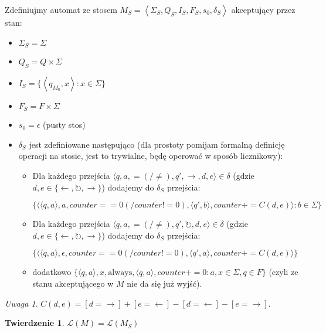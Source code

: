 \documentclass{article}
\newtheorem{theorem}{Twierdzenie}[section]
\theoremstyle{definition}
\theoremstyle{remark}
\newtheorem{remark}{Uwaga}[section]
\begin{document}
Zdefiniujmy automat ze stosem \(M_S = \left<\Sigma_S, Q_S, I_{S}, F_S, s_0, \delta_S \right>\) akceptujący przez stan:
\begin{itemize}
\item \(\Sigma_S = \Sigma\)
\item \(Q_S = Q \times \Sigma\)
\item \(I_S = \{ \left< q_{M_0}, x\right>: x \in \Sigma \}\)
\item \(F_S = F \times \Sigma\)
\item \(s_0 = \epsilon\) (pusty stos)
\item \(\delta_S\) jest zdefiniowane następująco (dla prostoty pomijam formalną definicję operacji na stosie, jest to trywialne,
będę operować w sposób licznikowy):
\begin{itemize}
    \item Dla każdego przejścia $\langle q, a, = (/ \neq), q', \rightarrow, d, e \rangle \in \delta$ (gdzie $d, e \in \{\leftarrow, \circlearrowright, \rightarrow\}$) dodajemy do $\delta_S$ przejścia:

    $\{\langle \langle q,a \rangle, a, counter==0 (/ counter!=0), \langle q',b \rangle, counter+=C(d,e) \rangle : b \in \Sigma\}$
    
    \item Dla każdego przejścia $\langle q, a, = (/ \neq), q', \circlearrowright, d, e \rangle \in \delta$ (gdzie $d, e \in \{\leftarrow, \circlearrowright, \rightarrow\}$) dodajemy do $\delta_S$ przejścia: 
    
    $\{\langle \langle q,a \rangle, \epsilon, counter==0 (/ counter!=0), \langle q',a \rangle, counter+=C(d,e) \rangle\}$

    \item dodatkowo $\{ \langle q, a \rangle, x, \text{always}, \langle q, a \rangle, counter+=0: a, x \in \Sigma, q \in F \}$ (czyli ze stanu akceptującego w \(M\) nie da się już wyjść).
\end{itemize}

\end{itemize}

\begin{remark}
    $ C(d,e) = [d = \rightarrow] + [e = \leftarrow] - [d = \leftarrow] - [e = \rightarrow] $.
\end{remark}

\begin{theorem}
$\mathcal{L}(M) = \mathcal{L}(M_S)$
\end{theorem}
\end{document}
